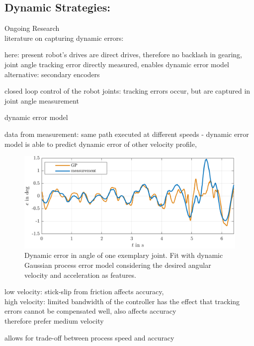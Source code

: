 \documentclass[5p,times,procedia]{elsarticle}
\begin{document}




\subsection{Dynamic Strategies:} Ongoing Research \\
literature on capturing dynamic errors:

here: present robot’s drives are direct drives, therefore no backlash in gearing, joint angle tracking error directly measured, 
enables dynamic error model
alternative: secondary encoders~\cite{Mesmer22}

closed loop control of the robot joints: tracking errors occur, but are captured in joint angle measurement

dynamic error model

data from measurement: same path executed at different speeds - dynamic error model is able to predict dynamic error of other velocity profile,

\begin{figure}[h]
	\centering
	\includegraphics[width=\columnwidth]{graphics/GP_eOf_dqDes_ddqDes_trainedOnFastestAndSlowest.png}
	\caption{Dynamic error in angle of one exemplary joint. Fit with dynamic Gaussian process error model considering the desired angular velocity and acceleration as features.}
	\label{fig:error_sources}
\end{figure}

low velocity: stick-slip from friction affects accuracy,\\
high velocity: limited bandwidth of the controller has the effect that tracking errors cannot be compensated well, also affects accuracy \\
therefore prefer medium velocity

allows for trade-off between process speed and accuracy
\end{document}
